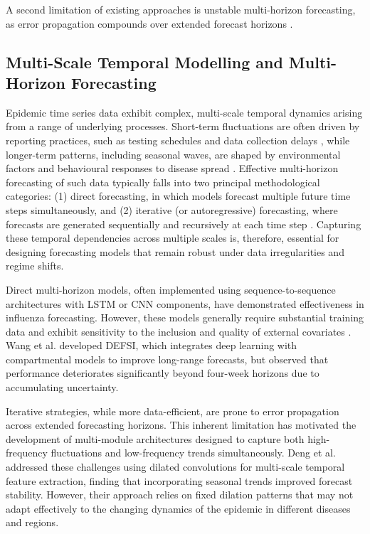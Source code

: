 \documentclass[final,1p,times]{elsarticle}
\begin{document}
A second limitation of existing approaches is unstable multi-horizon forecasting, as error propagation compounds over extended forecast horizons \cite{Brooks2018Nonmechanistic}.


\subsection{Multi-Scale Temporal Modelling and Multi-Horizon Forecasting}

Epidemic time series data exhibit complex, multi-scale temporal dynamics arising from a range of underlying processes. Short-term fluctuations are often driven by reporting practices, such as testing schedules and data collection delays \cite{Panja2022Epicasting}, while longer-term patterns, including seasonal waves, are shaped by environmental factors and behavioural responses to disease spread \cite{Stone2007Seasonal}. Effective multi-horizon forecasting of such data typically falls into two principal methodological categories: (1) direct forecasting, in which models forecast multiple future time steps simultaneously, and (2) iterative (or autoregressive) forecasting, where forecasts are generated sequentially and recursively at each time step \cite{Brooks2018Nonmechanistic}. Capturing these temporal dependencies across multiple scales is, therefore, essential for designing forecasting models that remain robust under data irregularities and regime shifts.

Direct multi-horizon models, often implemented using sequence-to-sequence architectures with LSTM or CNN components, have demonstrated effectiveness in influenza forecasting. However, these models generally require substantial training data and exhibit sensitivity to the inclusion and quality of external covariates \cite{wu2018deep, venna2019novel}. Wang et al. \cite{wang2019defsi} developed DEFSI, which integrates deep learning with compartmental models to improve long-range forecasts, but observed that performance deteriorates significantly beyond four-week horizons due to accumulating uncertainty.

Iterative strategies, while more data-efficient, are prone to error propagation across extended forecasting horizons. This inherent limitation has motivated the development of multi-module architectures designed to capture both high-frequency fluctuations and low-frequency trends simultaneously. Deng et al. \cite{dengColaGNNCrosslocationAttention2020a} addressed these challenges using dilated convolutions for multi-scale temporal feature extraction, finding that incorporating seasonal trends improved forecast stability. However, their approach relies on fixed dilation patterns that may not adapt effectively to the changing dynamics of the epidemic in different diseases and regions.
\end{document}
